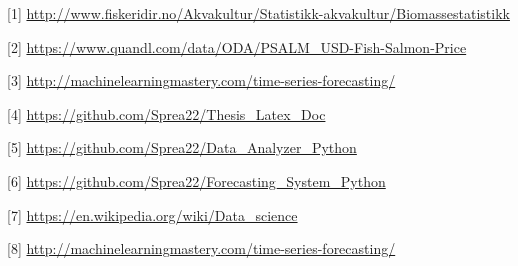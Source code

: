
[1] \url{http://www.fiskeridir.no/Akvakultur/Statistikk-akvakultur/Biomassestatistikk}


[2] \url{https://www.quandl.com/data/ODA/PSALM_USD-Fish-Salmon-Price}


[3] \url{http://machinelearningmastery.com/time-series-forecasting/}


[4] \url{https://github.com/Sprea22/Thesis_Latex_Doc}


[5] \url{https://github.com/Sprea22/Data_Analyzer_Python}


[6] \url{https://github.com/Sprea22/Forecasting_System_Python}

[7] \url{https://en.wikipedia.org/wiki/Data_science}

[8] \url{http://machinelearningmastery.com/time-series-forecasting/}